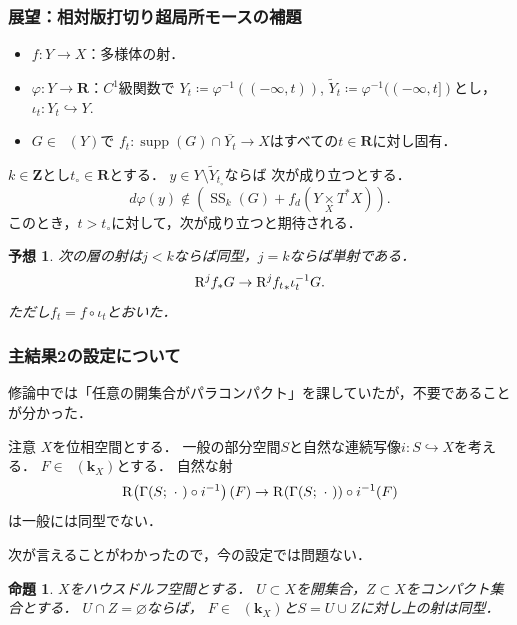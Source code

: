 \documentclass[dvipdfmx,10pt,aspectratio=169,leqno]{beamer}%
\newcommand{\zz}{\mathbf{Z}}
\newcommand{\rr}{\mathbf{R}}
\newcommand{\kk}{\mathbf{k}}
\numberwithin{equation}{subsection}
\newcommand{\supp}{\mathop{\mathrm{supp}}\nolimits}
\newcommand{\Dompl}{\mathop{\mathsf{D}^\mathrm{+}}\nolimits}
\newcommand{\Dompb}{\mathop{\mathsf{D}^\mathrm{b}}\nolimits}
\newcommand{\muS}[1][]{\mathop{\mathrm{SS}}\nolimits_{#1}}
\newcommand{\Rder}[1][]{\mathop{\mathrm{R}^{#1}\hspace{-2pt}}\nolimits}
\newcommand{\blk}{\mathord{\ \cdot\ }}
\newcommand{\mdiff}[1][]{{#1}_{d}} %
\newcommand{\cotb}[1][]{T^{\ast}{#1}}
\newcommand{\pb}[1][]{\mathbin{\mathop{\times}\limits_{#1}}}
\theoremstyle{mystyle}
\newtheorem{PRP}[AXM]{命題}
\newtheorem{CNJ}[AXM]{予想}
\begin{document}
\begin{frame}
  \frametitle{展望：相対版打切り超局所モースの補題}
  \begin{itemize}
    \item \(f\colon Y\to X\)：多様体の射．
    \item \(\varphi\colon Y\to \rr\)：\(C^{1}\)級関数で
    \(Y_{t}\coloneqq \varphi^{-1}((-\infty,t))\), 
    \(\widetilde{Y}_{t}\coloneqq \varphi^{-1}((-\infty,t])\)とし，
    \(\iota_{t}\colon Y_{t}\hookrightarrow Y\).
    \item \(G\in\Dompb(Y)\)で
    \(f_{t}\colon \supp(G)\cap \overline{Y_t}\to X\)はすべての\(t\in\rr\)に対し固有．
  \end{itemize}
  \(k\in\zz\)とし\(t_{\circ}\in\rr\)とする．
  \(y\in Y\setminus \widetilde{Y}_{t_{\circ}}\)ならば
  次が成り立つとする．\[
      d\varphi(y)\notin \left(
        \muS[k](G)+ \mdiff[f]\left(
          Y\pb[X]\cotb[X]
        \right)
      \right).
    \]
  このとき，\(t>t_{\circ}\)に対して，次が成り立つと期待される．
  \begin{CNJ}
    次の層の射は\(j<k\)ならば同型，\(j=k\)ならば単射である．
    \[
      \Rder[j]{f_{\ast}}G
      \to
      \Rder[j]{{f_{t}}_{\ast}}\iota^{-1}_{t}G.
    \]
    ただし\(f_{t}=f\circ \iota_{t}\)とおいた．
  \end{CNJ}
\end{frame}

\begin{frame}
  \frametitle{主結果2の設定について}
  修論中では「任意の開集合がパラコンパクト」を課していたが，不要であることが分かった．

  \begin{alertblock}{注意}
    \(X\)を位相空間とする．
    一般の部分空間\(S\)と自然な連続写像\(
      i\colon S\hookrightarrow X
    \)を考える．
    \(F\in\Dompl(\kk_{X})\)とする．
    自然な射\[
      \Rder[]\left(\Gamma(S;\blk)\circ i^{-1}\right)(F)
      \to
      \Rder[]{(\Gamma(S;\blk))}\circ i^{-1}(F)
    \]は一般には同型でない．    
  \end{alertblock}
  次が言えることがわかったので，今の設定では問題ない．
  \begin{PRP}
    \(X\)をハウスドルフ空間とする．
    \(U\subset X\)を開集合，\(Z\subset X\)をコンパクト集合とする．
    \(U\cap Z=\varnothing\)ならば，
    \(F\in\Dompl(\kk_{X})\)と\(S=U\cup Z\)に対し上の射は同型．
  \end{PRP}
\end{frame}
\end{document}
